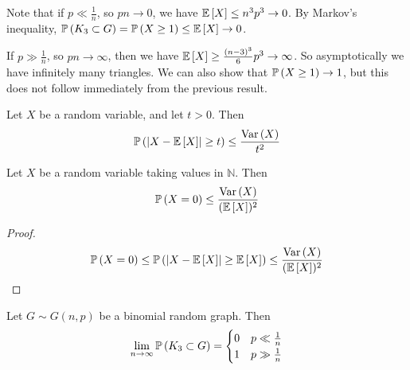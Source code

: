 Note that if \( p \ll \frac{1}{n} \), so \( pn \to 0 \), we have \( \mathbb{E}\left[{X}\right] \leq n^3 p^3 \to 0 \).
By Markov's inequality, \( \mathbb{P}\left({K_3 \subset G}\right) = \mathbb{P}\left({X \geq 1}\right) \leq \mathbb{E}\left[{X}\right] \to 0 \).

If \( p \gg \frac{1}{n} \), so \( pn \to \infty \), then we have \( \mathbb{E}\left[{X}\right] \geq \frac{(n - 3)^3}{6} p^3 \to \infty \).
So asymptotically we have infinitely many triangles.
We can also show that \( \mathbb{P}\left({X \geq 1}\right) \to 1 \), but this does not follow immediately from the previous result.
\begin{proposition}[Chebyshev]
	Let \( X \) be a random variable, and let \( t > 0 \).
	Then
	\[ \mathbb{P}\left({\abs{X - \mathbb{E}\left[{X}\right]} \geq t}\right) \leq \frac{\operatorname{Var}\left({X}\right)}{t^2} \]
\end{proposition}
\begin{proposition}
	Let \( X \) be a random variable taking values in \( \mathbb N \).
	Then
	\[ \mathbb{P}\left({X = 0}\right) \leq \frac{\operatorname{Var}\left({X}\right)}{(\mathbb{E}\left[{X}\right])^2} \]
\end{proposition}
\begin{proof}
	\[ \mathbb{P}\left({X = 0}\right) \leq \mathbb{P}\left({\abs{X - \mathbb{E}\left[{X}\right]} \geq \mathbb{E}\left[{X}\right]}\right) \leq \frac{\operatorname{Var}\left({X}\right)}{(\mathbb{E}\left[{X}\right])^2} \]
\end{proof}
\begin{theorem}
	Let \( G \sim G(n,p) \) be a binomial random graph.
	Then
	\[ \lim_{n \to \infty} \mathbb{P}\left({K_3 \subset G}\right) = \begin{cases}
		0 & p \ll \frac{1}{n} \\
		1 & p \gg \frac{1}{n}
	\end{cases} \]
\end{theorem}
